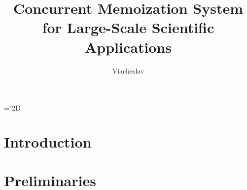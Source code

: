 \documentclass[thesis=B,english,hidelinks]{FITthesis}[2012/10/20]
\title{Concurrent Memoization System for Large-Scale Scientific Applications}
\author{Viacheslav} %
\begin{document}

\newcommand{\smplimage}[3][1]{
    \centerline{\texttt{[image: \#2.\#3]}}
}

\newcommand{\image}[4][1]{
\begin{figure}[H]
    \smplimage[#1]{#2}{#3}
	\caption{#4}
    \label{fig:#2}
\end{figure}
}

\newcommand{\func}[2]{\ensuremath{\textbf{\textit{#1}}(#2)}}
\newcommand{\nsnum}[2]{\ensuremath{\texttt{#1}_{#2}}}
\newcommand{\findop}{\func{find}{}\xspace}
\newcommand{\insertop}{\func{insert}{}\xspace}
\newcommand{\removeop}{\func{remove}{}\xspace}

\newcommand{\classname}[1]{\texttt{#1}\xspace}
\newcommand{\pathname}[1]{\path{#1}}

\mathchardef\mhyphen="2D


\newcommand\blockitem[1][]{%
  \closepage\item[#1]\minipage[t]{\linewidth}%
  \let\closepage\endminipage%
  }
\newenvironment{block-description}{%
  \description
  \let\olditem\item
  \let\closepage\relax
}{%
  \closepage
  \enddescription
}

\setlength{\parindent}{0em}
\setlength{\parskip}{1em}

\listoflistings

    \chapter{Introduction}
    


    \chapter{Preliminaries}
    \label{ch:pre}
    
\end{document}

